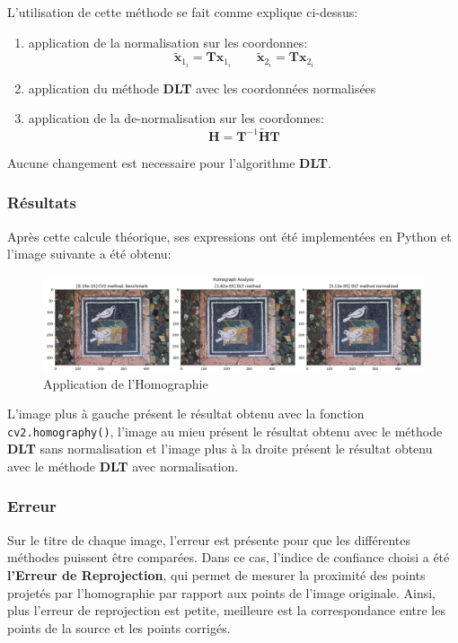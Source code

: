 \documentclass[../5RO17_TP1.tex]{subfiles}
\begin{document}
\noindent L'utilisation de cette méthode se fait comme explique ci-dessus:
\begin{enumerate}
    \item application de la normalisation sur les coordonnes:
    \begin{equation}
        \widetilde{\mathbf{x}}_{1_{i}} = \mathbf{T} \mathbf{x}_{1_{i}}
        \qquad
        \widetilde{\mathbf{x}}_{2_{i}} = \mathbf{T} \mathbf{x}_{2_{i}}
    \end{equation}
    \item application du méthode \textbf{DLT} avec les coordonnées normalisées
    \item application de la de-normalisation sur les coordonnes:
    \begin{equation}
        \mathbf{H} = \mathbf{T}^{-1} \widetilde{\mathbf{H}} \mathbf{T}
    \end{equation}
\end{enumerate}
\begin{remark}
    Aucune changement est necessaire pour l'algorithme \textbf{DLT}.
\end{remark}

\subsubsection{Résultats}
\noindent Après cette calcule théorique, ses expressions ont été implementées en Python et l'image suivante a été obtenu:
\begin{figure}[H]
    \centering
    \includegraphics[width = \linewidth]{../images/homography.png}
    \caption{Application de l'Homographie}
    \label{fig:homography}
\end{figure}
\noindent L'image plus à gauche présent le résultat obtenu avec la fonction \texttt{cv2.homography()}, l'image au mieu présent le résultat obtenu avec le méthode \textbf{DLT} sans normalisation et l'image plus à la droite présent le résultat obtenu avec le méthode \textbf{DLT} avec normalisation.

\subsubsection{Erreur}
\noindent Sur le titre de chaque image, l'erreur est présente pour que les différentes méthodes puissent être comparées. Dans ce cas, l'indice de confiance choisi a été \textbf{l'Erreur de Reprojection}, qui permet de mesurer la proximité des points projetés par l'homographie par rapport aux points de l'image originale. Ainsi, plus l'erreur de reprojection est petite, meilleure est la correspondance entre les points de la source et les points corrigés.\\
\end{document}
